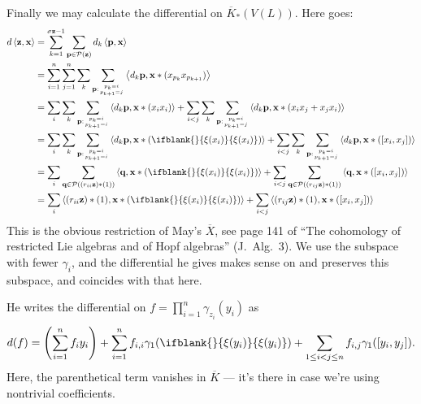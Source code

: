\documentclass[10pt]{article}
\newcommand{\restn}[2][]{\ifblank{#1}{\xi{#2}}{\xi_{#1}{#2}}}%
\begin{document}
\begin{PRlieKoszulComplexCalculation}
Finally we may calculate the differential on $\overline{K}_*(V(L))$. Here goes:
\begin{alignat*}{2}
d\left\langle \textbf{z},\textbf{x}\right\rangle
&=
\sum_{k=1}^{\sigma\textbf{z}-1} \sum_{\textbf{p}\in\calP(\textbf{z})}d_k\left\langle \textbf{p},\textbf{x}\right\rangle%
\\
&=
\sum_{i=1}^{n}\sum_{j=1}^{n}\sum_{k}\sum_{\textbf{p}:{p_k=i\atop p_{k+1}=j}}\left\langle d_k\textbf{p},\textbf{x}*(x_{p_k}x_{p_{k+1}})\right\rangle%
\\
&=
\sum_{i}\sum_{k}\sum_{\textbf{p}:{p_k=i\atop p_{k+1}=i}}\left\langle d_k\textbf{p},\textbf{x}*(x_ix_i)\right\rangle+\sum_{i<j} \sum_{k}\sum_{\textbf{p}:{p_k=i\atop p_{k+1}=j}}\left\langle d_k\textbf{p},\textbf{x}*(x_ix_j+x_jx_i)\right\rangle%
\\
&=
\sum_{i}\sum_{k}\sum_{\textbf{p}:{p_k=i\atop p_{k+1}=i}}\left\langle d_k\textbf{p},\textbf{x}*\left(\restn{(x_i)}\right)\right\rangle+ \sum_{i<j}\sum_{k}\sum_{\textbf{p}:{p_k=i\atop p_{k+1}=j}}\left\langle d_k\textbf{p},\textbf{x}*\left([x_i,x_j]\right)\right\rangle%
\\
&=
\sum_{i}\sum_{\textbf{q}\in\calP((r_{ii}\textbf{z})*(1))}\left\langle \textbf{q},\textbf{x}*\left(\restn{(x_i)}\right)\right\rangle+\sum_{i<j} \sum_{\textbf{q}\in\calP((r_{ij}\textbf{z})*(1))}\left\langle \textbf{q},\textbf{x}*\left([x_i,x_j]\right)\right\rangle%
\\
&=
\sum_{i}\left\langle (r_{ii}\textbf{z})*(1),\textbf{x}*\left(\restn{(x_i)}\right)\right\rangle+\sum_{i<j} \left\langle (r_{ij}\textbf{z})*(1),\textbf{x}*\left([x_i,x_j]\right)\right\rangle%
\end{alignat*}
This is the obvious restriction of May's $\overline{X}$, see page 141 of ``The cohomology of restricted Lie algebras and of Hopf algebras'' (J.\ Alg.\ 3). We use the subspace with fewer $\gamma_i$, and the differential he gives makes sense on and preserves this subspace, and coincides with that here.

He writes the differential on $f=\prod_{i=1}^{n}\gamma_{z_i}(y_i)$ as
\[d(f)=\left(\sum_{i=1}^{n}f_iy_i\right)+ \sum_{i=1}^{n}f_{i,i}\gamma_1(\restn{(y_i)})+\sum_{1\leq i<j\leq n}f_{i,j}\gamma_1([y_i,y_j]).\]
Here, the parenthetical term vanishes in $\overline{K}$ --- it's there in case we're using nontrivial coefficients.
\end{PRlieKoszulComplexCalculation}
\end{document}
